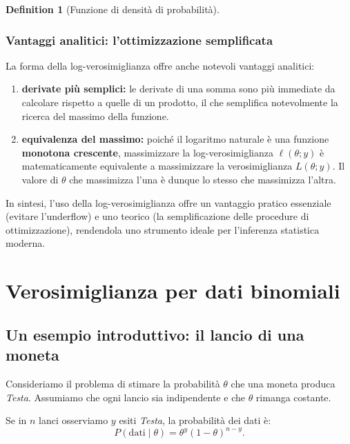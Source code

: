 \documentclass[
  letterpaper,
  DIV=11,
  numbers=noendperiod,
  oneside]{scrreprt}
\providecommand{\tightlist}{%
  \setlength{\itemsep}{0pt}\setlength{\parskip}{0pt}}
\theoremstyle{definition}
\theoremstyle{plain}
\theoremstyle{definition}
\newtheorem{definition}{Definition}[chapter]
\theoremstyle{remark}
\begin{document}
\begin{definition}[Funzione di densità di
probabilità]
\begin{tcolorbox}
\end{tcolorbox}

\subsubsection{Vantaggi analitici: l'ottimizzazione
semplificata}\label{vantaggi-analitici-lottimizzazione-semplificata}

La forma della log-verosimiglianza offre anche notevoli vantaggi
analitici:

\begin{enumerate}
\def\labelenumi{\arabic{enumi}.}
\tightlist
\item
  \textbf{derivate più semplici:} le derivate di una somma sono più
  immediate da calcolare rispetto a quelle di un prodotto, il che
  semplifica notevolmente la ricerca del massimo della funzione.
\item
  \textbf{equivalenza del massimo:} poiché il logaritmo naturale è una
  funzione \textbf{monotona crescente}, massimizzare la
  log-verosimiglianza \(\ell(\theta; y)\) è matematicamente equivalente
  a massimizzare la verosimiglianza \(L(\theta; y)\). Il valore di
  \(\theta\) che massimizza l'una è dunque lo stesso che massimizza
  l'altra.
\end{enumerate}

In sintesi, l'uso della log-verosimiglianza offre un vantaggio pratico
essenziale (evitare l'underflow) e uno teorico (la semplificazione delle
procedure di ottimizzazione), rendendola uno strumento ideale per
l'inferenza statistica moderna.

\section{Verosimiglianza per dati
binomiali}\label{verosimiglianza-per-dati-binomiali}

\subsection{Un esempio introduttivo: il lancio di una
moneta}\label{un-esempio-introduttivo-il-lancio-di-una-moneta}

Consideriamo il problema di stimare la probabilità \(\theta\) che una
moneta produca \emph{Testa}. Assumiamo che ogni lancio sia indipendente
e che \(\theta\) rimanga costante.

Se in \(n\) lanci osserviamo \(y\) esiti \emph{Testa}, la probabilità
dei dati è: \[
P(\text{dati} \mid \theta) = \theta^y (1-\theta)^{n-y}.
\]


\end{definition}
\end{document}
